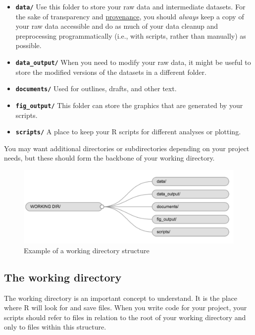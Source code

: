 \documentclass[]{book}
\providecommand{\tightlist}{%
  \setlength{\itemsep}{0pt}\setlength{\parskip}{0pt}}
\begin{document}
\begin{itemize}
\tightlist
\item
  \textbf{\texttt{data/}} Use this folder to store your raw data and
  intermediate datasets. For the sake of transparency and
  \href{https://en.wikipedia.org/wiki/Provenance}{provenance}, you
  should \emph{always} keep a copy of your raw data accessible and do as
  much of your data cleanup and preprocessing programmatically (i.e.,
  with scripts, rather than manually) as possible.
\item
  \textbf{\texttt{data\_output/}} When you need to modify your raw data,
  it might be useful to store the modified versions of the datasets in a
  different folder.
\item
  \textbf{\texttt{documents/}} Used for outlines, drafts, and other
  text.
\item
  \textbf{\texttt{fig\_output/}} This folder can store the graphics that
  are generated by your scripts.
\item
  \textbf{\texttt{scripts/}} A place to keep your R scripts for
  different analyses or plotting.
\end{itemize}

You may want additional directories or subdirectories depending on your
project needs, but these should form the backbone of your working
directory.

\begin{figure}
\centering
\includegraphics{./fig/working-directory-structure.png}
\caption{Example of a working directory structure}
\end{figure}

\subsection{The working directory}\label{the-working-directory}

The working directory is an important concept to understand. It is the
place where R will look for and save files. When you write code for your
project, your scripts should refer to files in relation to the root of
your working directory and only to files within this structure.
\end{document}
